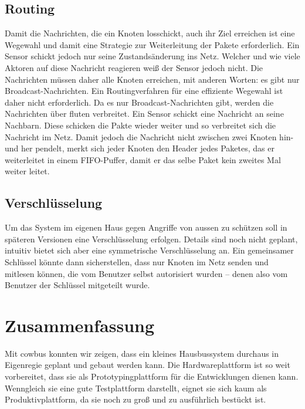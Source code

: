 \documentclass{IEEEtran}
\begin{document}
    \subsection{Routing}
        Damit die Nachrichten, die ein Knoten losschickt, auch ihr Ziel 
        erreichen ist eine Wegewahl und damit eine Strategie zur Weiterleitung 
        der Pakete erforderlich. Ein Sensor schickt jedoch nur seine 
        Zustandsänderung ins Netz. Welcher und wie viele Aktoren auf diese 
        Nachricht reagieren weiß der Sensor jedoch nicht. Die Nachrichten müssen 
        daher alle Knoten erreichen, mit anderen Worten: es gibt nur 
        Broadcast-Nachrichten. Ein Routingverfahren für eine effiziente Wegewahl 
        ist daher nicht erforderlich.
        Da es nur Broadcast-Nachrichten gibt, werden die Nachrichten über fluten 
        verbreitet. Ein Sensor schickt eine Nachricht an seine Nachbarn. Diese 
        schicken die Pakte wieder weiter und so verbreitet sich die Nachricht im 
        Netz. Damit jedoch die Nachricht nicht zwischen zwei Knoten hin- und 
        her pendelt, merkt sich jeder Knoten den Header jedes Paketes, das er 
        weiterleitet in einem FIFO-Puffer, damit er das selbe Paket kein 
        zweites Mal weiter leitet.
        

    \subsection{Verschlüsselung}
        Um das System im eigenen Haus gegen Angriffe von aussen zu schützen soll in 
        späteren Versionen eine Verschlüsselung erfolgen.
        Details sind noch nicht geplant, intuitiv bietet sich aber eine
        symmetrische Verschlüsselung an. Ein gemeinsamer Schlüssel könnte
        dann sicherstellen, dass nur Knoten im Netz senden und mitlesen können,
        die vom Benutzer selbst autorisiert wurden -- denen also vom Benutzer
        der Schlüssel mitgeteilt wurde.






\section{Zusammenfassung}

Mit cowbus konnten wir zeigen, dass ein kleines Hausbussystem durchaus in
Eigenregie geplant und gebaut werden kann.
Die Hardwareplattform ist so weit vorbereitet, dass sie als Prototypingplattform
für die Entwicklungen dienen kann.
Wenngleich sie eine gute Testplattform darstellt,
eignet sie sich kaum als Produktivplattform,
da sie noch zu groß und zu ausführlich bestückt ist.
\end{document}
